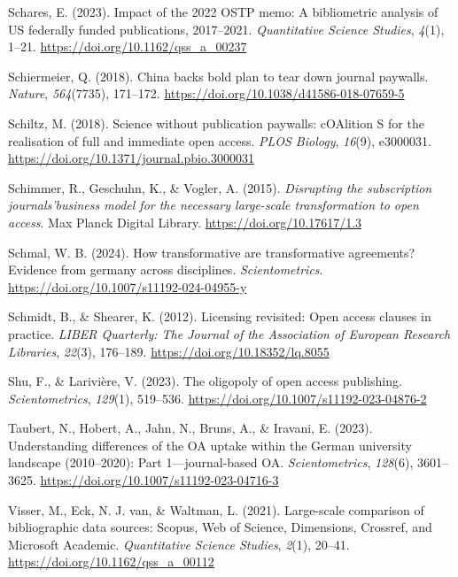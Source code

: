 \documentclass[a4paper,man,floatsintext,longtable,noextraspace,12pt]{apa6}
\newenvironment{CSLReferences}%
  {}%
  {\par}
\begin{document}
\begin{CSLReferences}{1}{0}
\leavevmode{}%
Schares, E. (2023). Impact of the 2022 OSTP memo: A bibliometric
analysis of US federally funded publications, 2017--2021.
\emph{Quantitative Science Studies}, \emph{4}(1), 1--21.
\url{https://doi.org/10.1162/qss_a_00237}

\leavevmode{}%
Schiermeier, Q. (2018). China backs bold plan to tear down journal
paywalls. \emph{Nature}, \emph{564}(7735), 171--172.
\url{https://doi.org/10.1038/d41586-018-07659-5}

\leavevmode{}%
Schiltz, M. (2018). Science without publication paywalls: {cOAlition S}
for the realisation of full and immediate open access. \emph{PLOS
Biology}, \emph{16}(9), e3000031.
\url{https://doi.org/10.1371/journal.pbio.3000031}

\leavevmode{}%
Schimmer, R., Geschuhn, K., \& Vogler, A. (2015). \emph{{Disrupting the
subscription journals'business model for the necessary large-scale
transformation to open access}}. Max Planck Digital Library.
\url{https://doi.org/10.17617/1.3}

\leavevmode{}%
Schmal, W. B. (2024). How transformative are transformative agreements?
Evidence from germany across disciplines. \emph{Scientometrics}.
\url{https://doi.org/10.1007/s11192-024-04955-y}

\leavevmode{}%
Schmidt, B., \& Shearer, K. (2012). Licensing revisited: Open access
clauses in practice. \emph{LIBER Quarterly: The Journal of the
Association of European Research Libraries}, \emph{22}(3), 176--189.
\url{https://doi.org/10.18352/lq.8055}

\leavevmode{}%
Shu, F., \& Larivière, V. (2023). The oligopoly of open access
publishing. \emph{Scientometrics}, \emph{129}(1), 519--536.
\url{https://doi.org/10.1007/s11192-023-04876-2}

\leavevmode{}%
Taubert, N., Hobert, A., Jahn, N., Bruns, A., \& Iravani, E. (2023).
Understanding differences of the OA uptake within the {German}
university landscape (2010--2020): Part 1---journal-based OA.
\emph{Scientometrics}, \emph{128}(6), 3601--3625.
\url{https://doi.org/10.1007/s11192-023-04716-3}

\leavevmode{}%
Visser, M., Eck, N. J. van, \& Waltman, L. (2021). Large-scale
comparison of bibliographic data sources: {Scopus, Web of Science,
Dimensions, Crossref, and Microsoft Academic}. \emph{Quantitative
Science Studies}, \emph{2}(1), 20--41.
\url{https://doi.org/10.1162/qss_a_00112}


\end{CSLReferences}
\end{document}
